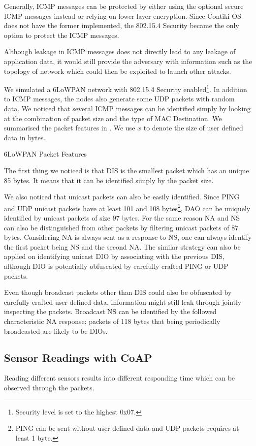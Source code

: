 Generally, ICMP messages can be protected by either using the optional secure ICMP messages instead or relying on lower layer encryption. Since Contiki OS does not have the former implemented, the 802.15.4 Security became the only option to protect the ICMP messages.

Although leakage in ICMP messages does not directly lead to any leakage of application data, it would still provide the adversary with information such as the topology of network which could then be exploited to launch other attacks.

We simulated a 6LoWPAN network with 802.15.4 Security enabled\footnote{Security level is set to the highest 0x07.}. In addition to ICMP messages, the nodes also generate some UDP packets with random data. We noticed that several ICMP messages can be identified simply by looking at the combination of packet size and the type of MAC Destination. We summarised the packet features in . We use $x$ to denote the size of user defined data in bytes.

\begin{table}
	\center
	
	\caption{6LoWPAN Packet Features\label{IcmpPacketFeature}}
\end{table}

The first thing we noticed is that DIS is the smallest packet which has an unique 85 bytes. It means that it can be identified simply by the packet size.

We also noticed that unicast packets can also be easily identified. Since PING and UDP unicast packets have at least 101 and 108 bytes\footnote{PING can be sent without user defined data and UDP packets requires at least 1 byte.}, DAO can be uniquely identified by unicast packets of size $97$ bytes. For the same reason NA and NS can also be distinguished from other packets by filtering unicast packets of $87$ bytes. Considering NA is always sent as a response to NS, one can always identify the first packet being NS and the second NA. The similar strategy can also be applied on identifying unicast  DIO by associating with the previous DIS, although DIO is potentially obfuscated by carefully crafted PING or UDP packets.

Even though broadcast packets other than DIS could also be obfuscated by carefully crafted user defined data, information might still leak through jointly inspecting the packets. Broadcast NS can be identified by the followed characteristic NA response; packets of 118 bytes that being periodically broadcasted are likely to be DIOs.


\subsection{Sensor Readings with CoAP}

Reading different sensors results into different responding time which can be observed through the packets.
